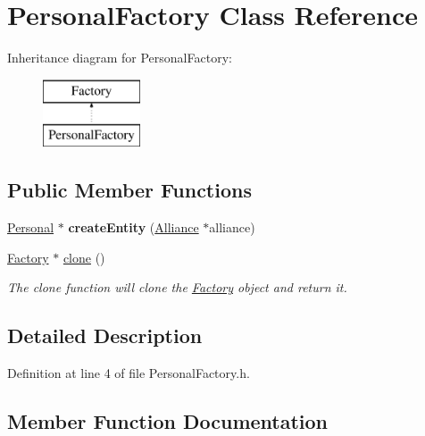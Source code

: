 \hypertarget{classPersonalFactory}{}\section{Personal\+Factory Class Reference}
\label{classPersonalFactory}
Inheritance diagram for Personal\+Factory\+:\begin{figure}[H]
\begin{center}
\leavevmode
\includegraphics[height=2.000000cm]{classPersonalFactory}
\end{center}
\end{figure}
\subsection*{Public Member Functions}
\begin{DoxyCompactItemize}
\item 
\mbox{\label{classPersonalFactory_adf5f6cc731784eff155c44666beadac9}} 
\hyperlink{classPersonal}{Personal} $\ast$ {\bfseries create\+Entity} (\hyperlink{classAlliance}{Alliance} $\ast$alliance)
\item 
\hyperlink{classFactory}{Factory} $\ast$ \hyperlink{classPersonalFactory_a555252a9f84f32f9ef4d5f90d74e53ca}{clone} ()
\begin{DoxyCompactList}\small\item\em The clone function will clone the \hyperlink{classFactory}{Factory} object and return it. \end{DoxyCompactList}\end{DoxyCompactItemize}


\subsection{Detailed Description}


Definition at line 4 of file Personal\+Factory.\+h.



\subsection{Member Function Documentation}
\mbox{\label{classPersonalFactory_a555252a9f84f32f9ef4d5f90d74e53ca}} 
